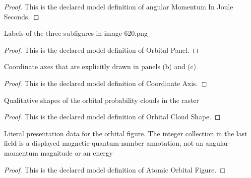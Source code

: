 \begin{proof}
  This is the declared model definition of angular Momentum In Joule Seconds.
\end{proof}
\begin{definition}
  \label{def:physics:phyx-mini-0620:phyxminiproblems-problemphyxmini0620-orbitalpanel}
  Labels of the three subfigures in image 620.png
\end{definition}
\begin{proof}
  This is the declared model definition of Orbital Panel.
\end{proof}
\begin{definition}
  \label{def:physics:phyx-mini-0620:phyxminiproblems-problemphyxmini0620-coordinateaxis}
  Coordinate axes that are explicitly drawn in panels (b) and (c)
\end{definition}
\begin{proof}
  This is the declared model definition of Coordinate Axis.
\end{proof}
\begin{definition}
  \label{def:physics:phyx-mini-0620:phyxminiproblems-problemphyxmini0620-orbitalcloudshape}
  Qualitative shapes of the orbital probability clouds in the raster
\end{definition}
\begin{proof}
  This is the declared model definition of Orbital Cloud Shape.
\end{proof}
\begin{definition}
  \label{def:physics:phyx-mini-0620:phyxminiproblems-problemphyxmini0620-atomicorbitalfigure}
  Literal presentation data for the orbital figure. The integer collection in the last field is a displayed magnetic-quantum-number annotation, not an angular-momentum magnitude or an energy
\end{definition}
\begin{proof}
  This is the declared model definition of Atomic Orbital Figure.
\end{proof}
